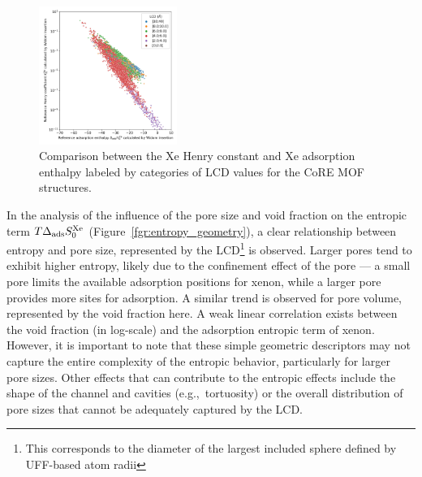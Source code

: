 \documentclass[main.tex]{subfiles}
\begin{document}
\begin{figure}[ht]
  \centering
  \includegraphics[width=0.4\textwidth]{figures/2-thermo/H_Xe_widom_vs_K_Xe_widom_overview.jpg}
  \caption{Comparison between the Xe Henry constant and Xe adsorption enthalpy labeled by categories of LCD values for the CoRE MOF structures.}\label{fgr:henry_enthalpy}
\end{figure}

In the analysis of the influence of the pore size and void fraction on the entropic term $T\Delta_{\text{ads}}S^{\text{Xe}}_{\text{0}}$ (Figure~\ref{fgr:entropy_geometry}), a clear relationship between entropy and pore size, represented by the LCD\footnote[1]{This corresponds to the diameter of the largest included sphere defined by UFF-based atom radii} is observed. Larger pores tend to exhibit higher entropy, likely due to the confinement effect of the pore --- a small pore limits the available adsorption positions for xenon, while a larger pore provides more sites for adsorption. A similar trend is observed for pore volume, represented by the void fraction here. A weak linear correlation exists between the void fraction (in log-scale) and the adsorption entropic term of xenon. However, it is important to note that these simple geometric descriptors may not capture the entire complexity of the entropic behavior, particularly for larger pore sizes. Other effects that can contribute to the entropic effects include the shape of the channel and cavities (e.g.,\ tortuosity) or the overall distribution of pore sizes that cannot be adequately captured by the LCD.
\end{document}
